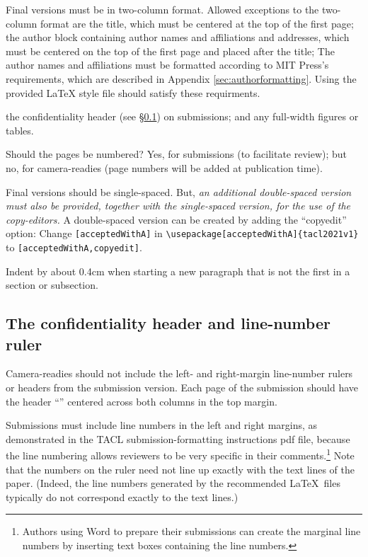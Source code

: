 \documentclass[11pt,a4paper]{article}
\newcommand{\styleFileVersion}{tacl2021v1}
\newcommand{\Taclpaper}{Final version\xspace}
\newcommand{\Taclpapers}{Final versions\xspace}
\newcommand{\Taclpaper}{Submission\xspace}
\newcommand{\Taclpapers}{{\Taclpaper}s\xspace}
\begin{document}
\Taclpapers must be in two-column format.
Allowed exceptions to the two-column format are the title, which must be
centered at the top of the first page;
\iftaclpubformat
the author block containing author names and affiliations and addresses, which
must be centered on the top of the first page and placed after the
title; The author names and affiliations must be formatted according
to MIT Press's requirements, which are described in Appendix
\ref{sec:authorformatting}. Using the provided LaTeX style file should
satisfy these requirments.

\else
the  confidentiality header (see \S\ref{sec:ruler-and-header}) on submissions;
\fi
and any full-width figures or tables.

Should the pages be numbered?  Yes, for submissions (to facilitate review); but
no, for camera-readies (page numbers will be added at publication time).

\Taclpapers should be single-spaced.
\iftaclpubformat
But, {\em an additional double-spaced version must also be provided, together with the
single-spaced version, for the use of the copy-editors.}  A double-spaced version can
be created by adding the ``copyedit'' option: Change \verb+[acceptedWithA]+ in
{\footnotesize {\tt {\textbackslash usepackage}[acceptedWithA]\{\styleFileVersion\}}}
to \verb+[acceptedWithA,copyedit]+.
\fi

{Indent} by about 0.4cm when starting a new paragraph that is not the first in a
section or subsection.

\subsection{The confidentiality header and line-number ruler}
\label{sec:ruler-and-header}
\iftaclpubformat
Camera-readies should not include the left- and right-margin line-number rulers
or headers from the submission version.
\else
Each page of the submission should have the header ``\confidentialtext''
centered across both columns in the top margin.

Submissions must include line numbers in the left and right
margins, as demonstrated in the TACL submission-formatting
instructions pdf file, because the line numbering allows reviewers to be very
specific in their comments.\footnote{Authors using Word to prepare their
submissions can create the marginal line numbers by inserting text
boxes containing the line numbers.}
Note that the numbers on the ruler need not line up exactly with the text lines
of the paper. (Indeed, the line numbers generated by the recommended \LaTeX{}les typically do not correspond exactly to the text lines.)
\fi
\end{document}
